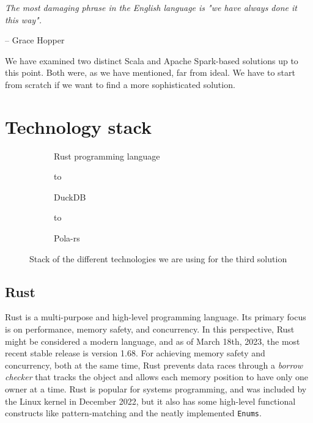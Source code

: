 \epigraph{\textit{The most damaging phrase in the English language is "we have always done it this way".}}{-- \textup{Grace Hopper}}

We have examined two distinct Scala and Apache Spark-based solutions up to this point. Both were, as we have mentioned, far from ideal. We have to start from scratch if we want to find a more sophisticated solution.

\section{Technology stack}

\begin{figure}[ht]
    \centering
    \newsavebox\mybox
    \begin{subfigure}{.3\textwidth}
        \centering
        \usebox{\mybox}
        \caption{Rust programming language}
    \end{subfigure}%
    \hspace*{0.1em}
    \begin{subfigure}{.3\textwidth}
        \centering
        \vbox to \ht{}
        \caption{DuckDB}
    \end{subfigure}%
    \hspace*{0.1em}
    \begin{subfigure}{.3\textwidth}
        \centering
        \vbox to \ht{}
        \caption{Pola-rs}
    \end{subfigure}%
    \caption{Stack of the different technologies we are using for the third solution}
\end{figure}

\subsection{Rust}

Rust is a multi-purpose and high-level programming language. Its primary focus is on performance, memory safety, and concurrency. In this perspective, Rust might be considered a modern language, and as of March 18th, 2023, the most recent stable release is version 1.68. For achieving memory safety and concurrency, both at the same time, Rust prevents data races through a \textit{borrow checker} that tracks the object and allows each memory position to have only one owner at a time. Rust is popular for systems programming, and was included by the Linux kernel in December 2022, but it also has some high-level functional constructs like pattern-matching and the neatly implemented \texttt{Enums}.


